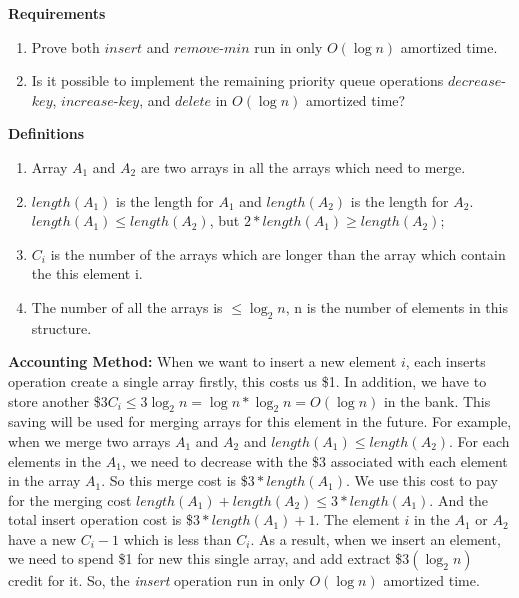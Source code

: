 \begin{homeworkProblem}

\textbf{Requirements}
    \begin{enumerate}
        \item Prove both $insert$ and $remove$-$min$ run in only $O(\log n)$ amortized time.
        \item Is it possible to implement the remaining priority queue operations $decrease$-$key$, $increase$-$key$, and $delete$ in $O(\log n)$ amortized time?
    \end{enumerate}


\textbf{Definitions}
    \begin{enumerate}
        \item Array $A_1$ and $A_2$ are two arrays in all the arrays which need to merge.
        \item $length(A_1)$ is the length for $A_1$ and $length(A_2)$ is the length for $A_2$. $length(A_1)\leq length(A_2)$, but $2*length(A_1) \geq length(A_2)$;
        \item $C_i$ is the number of the arrays which are longer than the array which contain the this element i. 
        \item The number of all the arrays  is $\leq \log_2n$, n is the number of elements in this structure.
    \end{enumerate}

\textbf{Accounting Method:} When we want to insert a new element $i$, each inserts operation create a single array firstly, this costs us \$1. In addition, we have to store another \$$3C_i \leq 3\log_2 n = \log n * \log_2n = O(\log n)$ in the bank. This saving will be used for merging arrays for this element in the future. For example, when we merge two arrays $A_1$ and $A_2$ and $length(A_1)\leq length(A_2)$. For each elements in the $A_1$, we need to decrease with the \$3 associated with each element in the array $A_1$. So this merge cost is \$$3* length(A_1)$. We use this cost to pay for the merging cost $length(A_1) + length(A_2) \leq 3*length(A_1)$. And the total insert operation cost is  \$$3* length(A_1) + 1$. The element $i$ in the $A_1$ or $A_2$ have a new $C_i - 1$ which is less than $C_i$. As a result, when we insert an element, we need to spend \$1 for new this single array, and add extract \$$3(\log_2 n)$ credit for it. So, the \textit{insert} operation run in only $O(\log n)$ amortized time.
\\


\end{homeworkProblem}
